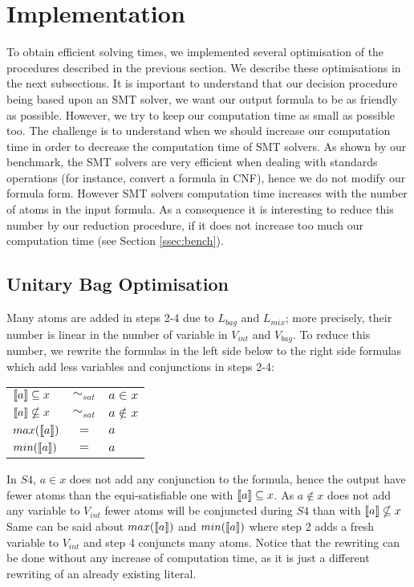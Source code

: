 \section{Implementation}
\label{sec:implementation}
To obtain efficient solving times, we implemented several optimisation of the procedures described in the previous section.
We describe these optimisations in the next subsections.
It is important to understand that our decision procedure being based upon an SMT solver, we want our output formula to be as friendly as possible.
However, we try to keep our computation time as small as possible too.
The challenge is to understand when we should increase our computation time in order to decrease the computation time of SMT solvers.
As shown by our benchmark, the SMT solvers are very efficient when dealing with standards operations (for instance, convert a formula in CNF), hence we do not modify our formula form.
However SMT solvers computation time increases with the number of atoms in the input formula. As a consequence it is interesting to reduce this number by
our reduction procedure, if it does not increase too much our computation time (see Section \ref{ssec:bench}).

\subsection{Unitary Bag Optimisation}
Many atoms are added in steps 2-4 due to $L_{bag}$ and $L_{mix}$; more precisely, their number is linear in the number of variable in $V_{int}$ and $V_{bag}$.
To reduce this number, we rewrite the formulas in the left side below to the right side formulas which add less variables and conjunctions in steps 2-4:
\begin{center}
\begin{tabular}{lcl}
  $\llbracket a \rrbracket \subseteq x$ & $\sim_{\mathit{sat}}$ & $a \in x$ \\
  $\llbracket a \rrbracket \nsubseteq x$ & $\sim_{\mathit{sat}}$ & $a \notin x$ \\
  $max(\llbracket a \rrbracket)$ & $=$ & $a$ \\
  $min(\llbracket a \rrbracket)$ & $=$ & $a$ \\
\end{tabular}
\end{center}
In $S4$,  $a \in x$ does not add any conjunction to the formula, hence the output have fewer atoms than the equi-satisfiable one with $\llbracket a \rrbracket \subseteq x$.
As $a \notin x$ does not add any variable to $V_{int}$ fewer atoms will be conjuncted during $S4$ than with $\llbracket a \rrbracket \nsubseteq x$
Same can be said about $max(\llbracket a \rrbracket)$ and $min(\llbracket a \rrbracket)$ where step 2 adds a fresh variable to $V_{int}$ and step 4 conjuncts many atoms.
Notice that the rewriting can be done without any increase of computation time, as it is just a different rewriting of an already existing literal.

